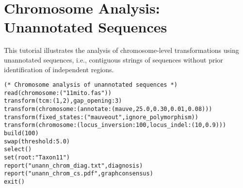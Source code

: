 
\section{Chromosome Analysis: Unannotated Sequences}{\label{tutorial8}}

This tutorial illustrates the analysis of chromosome-level transformations using 
unannotated sequences, i.e., contiguous strings of sequences without prior 
identification of independent regions. 

\begin{verbatim}
(* Chromosome analysis of unannotated sequences *)
read(chromosome:("11mito.fas"))
transform(tcm:(1,2),gap_opening:3)
transform(chromosome:(annotate:(mauve,25.0,0.30,0.01,0.08)))
transform(fixed_states:("mauveout",ignore_polymorphism))
transform(chromosome:(locus_inversion:100,locus_indel:(10,0.9)))
build(100)
swap(threshold:5.0)
select()
set(root:"Taxon11")
report("unann_chrom_diag.txt",diagnosis)
report("unann_chrom_cs.pdf",graphconsensus)
exit()
\end{verbatim}


